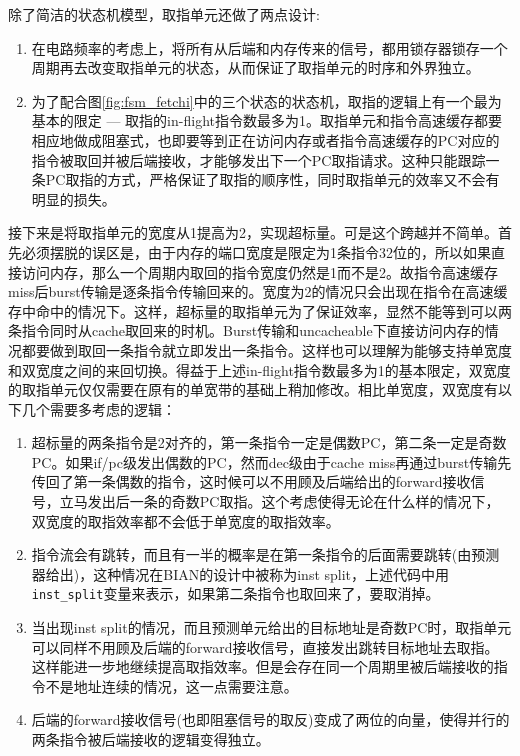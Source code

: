 除了简洁的状态机模型，取指单元还做了两点设计:
\begin{enumerate}[label=(\alph*)]
	\item 在电路频率的考虑上，将所有从后端和内存传来的信号，都用锁存器锁存一个周期再去改变取指单元的状态，从而保证了取指单元的时序和外界独立。
	\item 为了配合图\ref{fig:fsm_fetchi}中的三个状态的状态机，取指的逻辑上有一个最为基本的限定 --- 取指的in-flight指令数最多为1。取指单元和指令高速缓存都要相应地做成阻塞式，也即要等到正在访问内存或者指令高速缓存的PC对应的指令被取回并被后端接收，才能够发出下一个PC取指请求。这种只能跟踪一条PC取指的方式，严格保证了取指的顺序性，同时取指单元的效率又不会有明显的损失。
\end{enumerate}

接下来是将取指单元的宽度从1提高为2，实现超标量。可是这个跨越并不简单。首先必须摆脱的误区是，由于内存的端口宽度是限定为1条指令32位的，所以如果直接访问内存，那么一个周期内取回的指令宽度仍然是1而不是2。故指令高速缓存miss后burst传输是逐条指令传输回来的。宽度为2的情况只会出现在指令在高速缓存中命中的情况下。这样，超标量的取指单元为了保证效率，显然不能等到可以两条指令同时从cache取回来的时机。Burst传输和uncacheable下直接访问内存的情况都要做到取回一条指令就立即发出一条指令。这样也可以理解为能够支持单宽度和双宽度之间的来回切换。得益于上述in-flight指令数最多为1的基本限定，双宽度的取指单元仅仅需要在原有的单宽带的基础上稍加修改。相比单宽度，双宽度有以下几个需要多考虑的逻辑：
\begin{enumerate}[label=(\alph*)]
	\item 超标量的两条指令是2对齐的，第一条指令一定是偶数PC，第二条一定是奇数PC。如果if/pc级发出偶数的PC，然而dec级由于cache miss再通过burst传输先传回了第一条偶数的指令，这时候可以不用顾及后端给出的forward接收信号，立马发出后一条的奇数PC取指。这个考虑使得无论在什么样的情况下，双宽度的取指效率都不会低于单宽度的取指效率。
	\item 指令流会有跳转，而且有一半的概率是在第一条指令的后面需要跳转(由预测器给出)，这种情况在BIAN的设计中被称为inst split，上述代码中用\texttt{inst\_split}变量来表示，如果第二条指令也取回来了，要取消掉。
	\item 当出现inst split的情况，而且预测单元给出的目标地址是奇数PC时，取指单元可以同样不用顾及后端的forward接收信号，直接发出跳转目标地址去取指。这样能进一步地继续提高取指效率。但是会存在同一个周期里被后端接收的指令不是地址连续的情况，这一点需要注意。
	\item 后端的forward接收信号(也即阻塞信号的取反)变成了两位的向量，使得并行的两条指令被后端接收的逻辑变得独立。
\end{enumerate}

